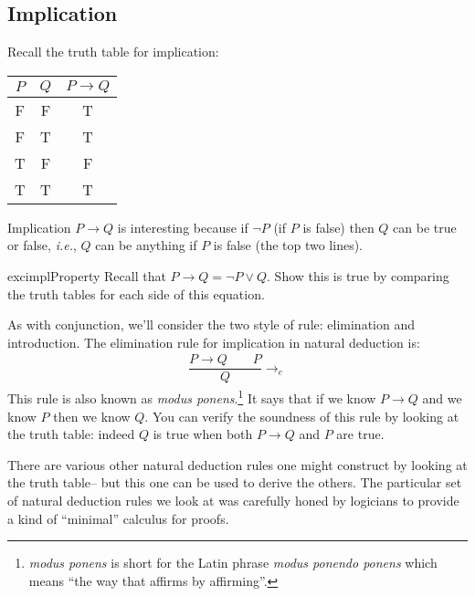 \documentclass{article}
\theoremstyle{definition}
\newcommand{\ie}{\emph{i.e.}}
\begin{document}
\subsection{Implication}

Recall the truth table for implication:
%
\begin{center}
\begin{tabular}{cc|c}
  $P$ & $Q$ & $P \rightarrow Q$ \\ \hline
  \rowcolor{yellow} F & F & T \\
  \rowcolor{yellow} F & T & T \\
  T & F & F \\
  \rowcolor{yellow} T & T & T
\end{tabular}
\end{center}
%
Implication $P \rightarrow Q$ is interesting because if
$\neg P$ (if $P$ is false) then $Q$ can be true or false, \ie{},
$Q$ can be anything if $P$ is false (the top two lines).

\begin{restatable}{exc}{implProperty}
Recall that $P \rightarrow Q = \neg P \vee Q$. Show this is true
by comparing the truth tables for each side of this equation.
\end{restatable}

As with conjunction, we'll consider the two style of
rule: elimination and introduction.
The elimination rule for implication in natural deduction is:
\begin{align*}
\dfrac{P \rightarrow Q \qquad P}{Q} {\rightarrow_e}
\end{align*}
%
This rule is also known as \emph{modus ponens}.\footnote{\emph{modus
ponens} is short for the Latin phrase \emph{modus ponendo ponens}
which means ``the way that affirms by affirming''.} It says that if
we know $P \rightarrow Q$ and we know $P$ then we know $Q$. You can
verify the soundness of this rule by looking at the truth
table: indeed $Q$ is true when both $P \rightarrow Q$ and $P$ are
true.

There are various other natural deduction rules one might construct by
looking at the truth table-- but this one can be used to derive the
others. The particular set of natural deduction rules we look at was
carefully honed by logicians to provide a kind of ``minimal'' calculus
for proofs.
\end{document}
